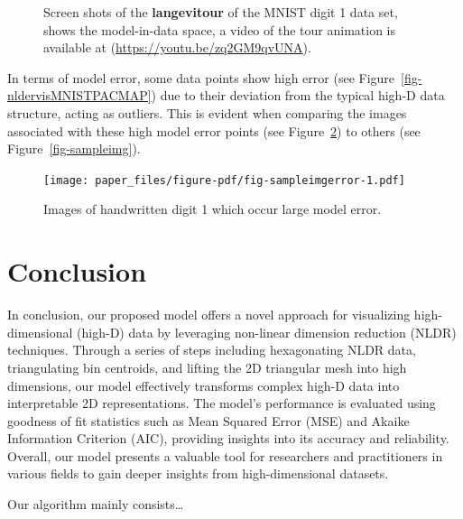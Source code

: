 \documentclass[
  12pt]{article}
\begin{document}
\begin{figure}[H]
\begin{minipage}[t]{0.33\linewidth}
{{}

}

\subcaption{\label{fig-mnist1_sc3}}
\end{minipage}%

\caption{\label{fig-mnist1_sc}Screen shots of the \textbf{langevitour}
of the MNIST digit 1 data set, shows the model-in-data space, a video of
the tour animation is available at
(\url{https://youtu.be/zq2GM9qvUNA}).}

\end{figure}

In terms of model error, some data points show high error (see
Figure~\ref{fig-nldervisMNISTPACMAP}) due to their deviation from the
typical high-D data structure, acting as outliers. This is evident when
comparing the images associated with these high model error points (see
Figure~\ref{fig-sampleimgerror}) to others (see
Figure~\ref{fig-sampleimg}).

\begin{figure}[H]

{\centering \texttt{[image: paper\_files/figure-pdf/fig-sampleimgerror-1.pdf]}

}

\caption{\label{fig-sampleimgerror}Images of handwritten digit 1 which
occur large model error.}

\end{figure}

\hypertarget{sec-conclusion}{%
\section{Conclusion}\label{sec-conclusion}}

In conclusion, our proposed model offers a novel approach for
visualizing high-dimensional (high-D) data by leveraging non-linear
dimension reduction (NLDR) techniques. Through a series of steps
including hexagonating NLDR data, triangulating bin centroids, and
lifting the 2D triangular mesh into high dimensions, our model
effectively transforms complex high-D data into interpretable 2D
representations. The model's performance is evaluated using goodness of
fit statistics such as Mean Squared Error (MSE) and Akaike Information
Criterion (AIC), providing insights into its accuracy and reliability.
Overall, our model presents a valuable tool for researchers and
practitioners in various fields to gain deeper insights from
high-dimensional datasets.

Our algorithm mainly consists\ldots{}
\end{document}
